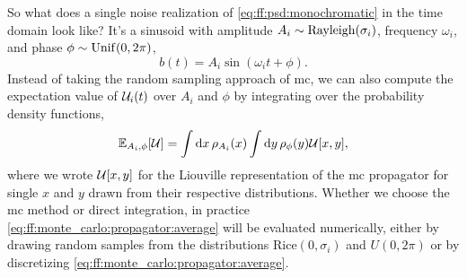 So what does a single noise realization of \cref{eq:ff:psd:monochromatic} in the time domain look like? 
It's a sinusoid with amplitude $A_i \sim\operatorname{Rayleigh}(\sigma_i)$,
frequency $\omega_i$, and phase $\phi \sim \operatorname{Unif}(0, 2\pi)$,
\begin{equation}\label{eq:ff:monte_carlo:noise_trace}
    b(t) = A_i\sin(\omega_i t + \phi).
\end{equation}
Instead of taking the random sampling approach of \gls{mc}, we can also compute the expectation value of $\mathcal{U}_i(t)$ over $A_i$ and $\phi$ by integrating over the probability density functions,
\begin{equation}
    \label{eq:ff:monte_carlo:propagator:average}
    \mathbb{E}_{A_i,\phi}[\mathcal{U}] = \int\dd{x}\rho_{A_i}(x)\int\dd{y}\rho_{\phi}(y)\mathcal{U}[x, y],
\end{equation}
where we wrote $\mathcal{U}[x, y]$ for the Liouville representation of the \gls{mc} propagator for single $x$ and $y$ drawn from their respective distributions.
Whether we choose the \gls{mc} method or direct integration, in practice \cref{eq:ff:monte_carlo:propagator:average} will be evaluated numerically, either by drawing random samples from the distributions $\text{Rice}(0, \sigma_i)$ and $U(0,2\pi)$ or by discretizing \cref{eq:ff:monte_carlo:propagator:average}.

